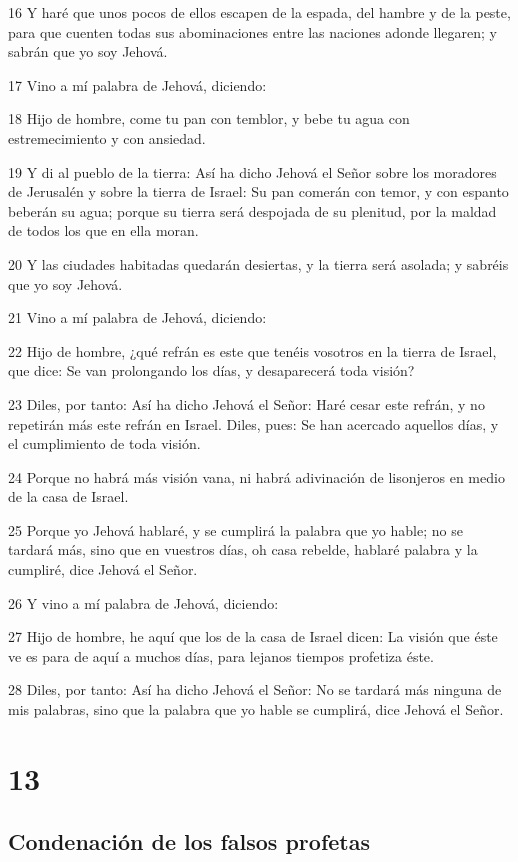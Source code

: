 \par 16 Y haré que unos pocos de ellos escapen de la espada, del hambre y de la peste, para que cuenten todas sus abominaciones entre las naciones adonde llegaren; y sabrán que yo soy Jehová.
\par 17 Vino a mí palabra de Jehová, diciendo:
\par 18 Hijo de hombre, come tu pan con temblor, y bebe tu agua con estremecimiento y con ansiedad. 
\par 19 Y di al pueblo de la tierra: Así ha dicho Jehová el Señor sobre los moradores de Jerusalén y sobre la tierra de Israel: Su pan comerán con temor, y con espanto beberán su agua; porque su tierra será despojada de su plenitud, por la maldad de todos los que en ella moran.
\par 20 Y las ciudades habitadas quedarán desiertas, y la tierra será asolada; y sabréis que yo soy Jehová.
\par 21 Vino a mí palabra de Jehová, diciendo:
\par 22 Hijo de hombre, ¿qué refrán es este que tenéis vosotros en la tierra de Israel, que dice: Se van prolongando los días, y desaparecerá toda visión?
\par 23 Diles, por tanto: Así ha dicho Jehová el Señor: Haré cesar este refrán, y no repetirán más este refrán en Israel. Diles, pues: Se han acercado aquellos días, y el cumplimiento de toda visión.
\par 24 Porque no habrá más visión vana, ni habrá adivinación de lisonjeros en medio de la casa de Israel.
\par 25 Porque yo Jehová hablaré, y se cumplirá la palabra que yo hable; no se tardará más, sino que en vuestros días, oh casa rebelde, hablaré palabra y la cumpliré, dice Jehová el Señor.
\par 26 Y vino a mí palabra de Jehová, diciendo:
\par 27 Hijo de hombre, he aquí que los de la casa de Israel dicen: La visión que éste ve es para de aquí a muchos días, para lejanos tiempos profetiza éste.
\par 28 Diles, por tanto: Así ha dicho Jehová el Señor: No se tardará más ninguna de mis palabras, sino que la palabra que yo hable se cumplirá, dice Jehová el Señor.

\chapter{13}

\section*{Condenación de los falsos profetas}

